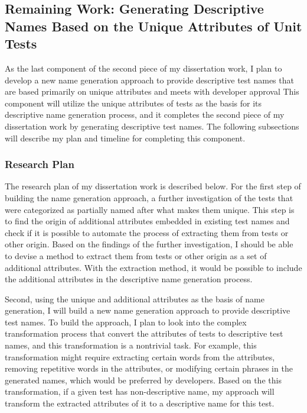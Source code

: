 \subsection{Remaining Work: Generating Descriptive Names Based on the Unique Attributes of Unit Tests}
\label{sec:remaining-work}

As the last component of the second piece of my dissertation work, I plan to develop a new name generation approach to provide descriptive test names that are based primarily on unique attributes and meets with developer approval
%
This component will utilize the unique attributes of tests as the basis for its descriptive name generation process, and it completes the second piece of my dissertation work by generating descriptive test names.
%
The following subsections will describe my plan and timeline for completing this component.


\subsubsection{Research Plan}

The research plan of my dissertation work is described below.
%
For the first step of building the name generation approach, a further investigation of the tests that were categorized as partially named after what makes them unique.
%
This step is to find the origin of additional attributes embedded in existing test names and check if it is possible to automate the process of extracting them from tests or other origin.
%
Based on the findings of the further investigation, I should be able to devise a method to extract them from tests or other origin as a set of additional attributes.
%
With the extraction method, it would be possible to include the additional attributes in the descriptive name generation process.


Second, using the unique and additional attributes as the basis of name generation, I will build a new name generation approach to provide descriptive test names.
%
To build the approach, I plan to look into the complex transformation process that convert the attributes of tests to descriptive test names, and this transformation is a nontrivial task.
%
For example, this transformation might require extracting certain words from the attributes, removing repetitive words in the attributes, or modifying certain phrases in the generated names, which would be preferred by developers.
%
Based on the this transformation, if a given test has non-descriptive name, my approach will transform the extracted attributes of it to a descriptive name for this test.


